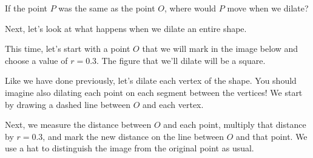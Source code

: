 \documentclass{ximera}
\begin{document}
\begin{question}
If the point $P$ was the same as the point $O$, where would $P$ move when we dilate?
\begin{multipleChoice}
\end{multipleChoice}
\end{question}

Next, let's look at what happens when we dilate an entire shape.

\begin{example}
This time, let's start with a point $O$ that we will mark in the image below and choose a value of $r=0.3$. The figure that we'll dilate will be a square. 
\begin{image}
\end{image}
Like we have done previously, let's dilate each vertex of the shape. You should imagine also dilating each point on each segment between the vertices! We start by drawing a dashed line between $O$ and each vertex.
\begin{image}
\end{image}
Next, we measure the distance between $O$ and each point, multiply that distance by $r=0.3$, and mark the new distance on the line between $O$ and that point. We use a hat to distinguish the image from the original point as usual.
\begin{image}
\begin{tikzpicture}

\end{tikzpicture}
\end{image}
\end{example}
\end{document}

